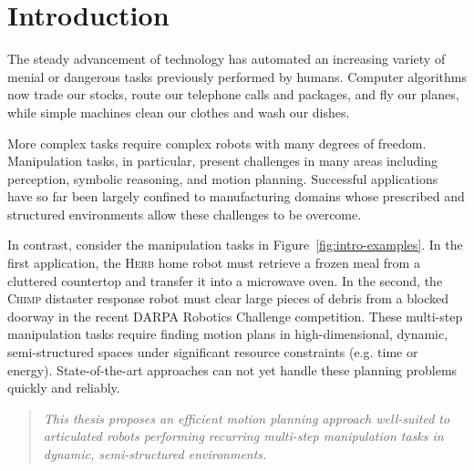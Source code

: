 \chapter{Introduction}

The steady advancement of technology
has automated an increasing variety of menial or dangerous tasks
previously performed by humans.
Computer algorithms now trade our stocks,
route our telephone calls and packages,
and fly our planes,
while simple machines clean our clothes and wash our dishes.

More complex tasks require complex robots with many
degrees of freedom.
Manipulation tasks, in particular,
present challenges in many areas including
perception, symbolic reasoning, and motion planning.
Successful applications have so far been largely
confined to manufacturing domains
whose prescribed and structured environments
allow these challenges to be overcome.

In contrast,
consider the manipulation tasks in Figure~\ref{fig:intro-examples}.
In the first application,
the \textsc{Herb} home robot must retrieve a frozen meal from 
a cluttered countertop
and transfer it into a microwave oven.
In the second,
the \textsc{Chimp} distaster response robot
must clear large pieces of debris from a blocked doorway
in the recent DARPA Robotics Challenge competition.
These multi-step manipulation tasks
require finding motion plans in
high-dimensional, dynamic, semi-structured spaces
under significant resource constraints (e.g. time or energy).
State-of-the-art approaches can not yet handle these
planning problems quickly and reliably.

\begin{quote}
\emph{%
This thesis proposes an
efficient motion planning approach
well-suited
to articulated robots
performing recurring multi-step manipulation tasks
in dynamic, semi-structured environments.
}
\end{quote}

